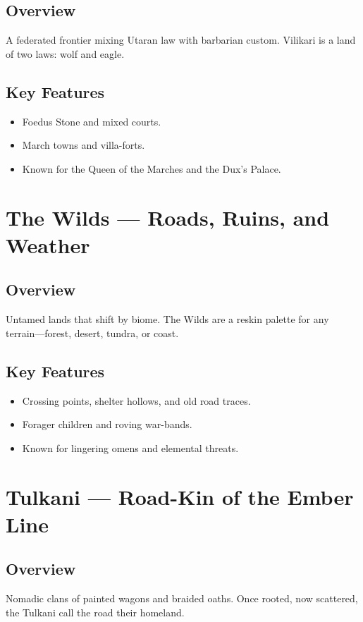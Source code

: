 \subsection*{Overview}
A federated frontier mixing Utaran law with barbarian custom. Vilikari is a land of two laws: wolf and eagle.

\subsection*{Key Features}
\begin{itemize}[leftmargin=*]
    \item Foedus Stone and mixed courts.
    \item March towns and villa-forts.
    \item Known for the Queen of the Marches and the Dux’s Palace.
\end{itemize}

\section{The Wilds — Roads, Ruins, and Weather}
\label{sec:lore-wilds}

\subsection*{Overview}
Untamed lands that shift by biome. The Wilds are a reskin palette for any terrain—forest, desert, tundra, or coast.

\subsection*{Key Features}
\begin{itemize}[leftmargin=*]
    \item Crossing points, shelter hollows, and old road traces.
    \item Forager children and roving war-bands.
    \item Known for lingering omens and elemental threats.
\end{itemize}

\section{Tulkani — Road-Kin of the Ember Line}
\label{sec:lore-tulkani}

\subsection*{Overview}
Nomadic clans of painted wagons and braided oaths. Once rooted, now scattered, the Tulkani call the road their homeland.

